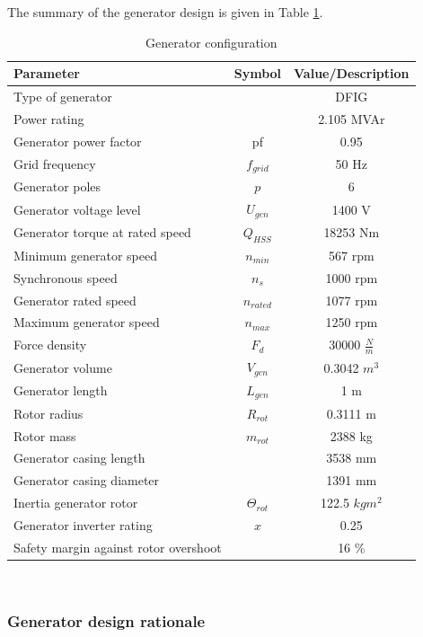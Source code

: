 The summary of the generator design is given in Table \ref{tab:generator_config}. 
\begin{table}[h]
\centering
\caption{Generator configuration}
\label{tab:generator_config}
\begin{tabular}{ |l|c|c|} 
\hline
\textbf{Parameter} & \textbf{Symbol} & \textbf{Value/Description}  \\ 
\hline
Type of generator & & DFIG\\
\hline
Power rating & & 2.105 MVAr\\
\hline
Generator power factor & pf & 0.95\\
\hline
Grid frequency & $f_{grid}$ & 50 Hz  \\
\hline
Generator poles & $p$ & 6\\
\hline
Generator voltage level & $U_{gen}$ & 1400 V\\
\hline
Generator torque at rated speed & $Q_{HSS}$ & 18253 Nm \\
\hline
Minimum generator speed & $n_{min}$ & 567 rpm\\
\hline
Synchronous speed & $n_s$ & 1000 rpm\\
\hline
Generator rated speed & $n_{rated}$ & 1077 rpm\\
\hline
Maximum generator speed & $n_{max}$ & 1250 rpm \\
\hline
Force density & $F_d$ & 30000 $\frac{N}{m}$\\
\hline
Generator volume & $V_{gen}$ & 0.3042 $m^3$\\
\hline
Generator length & $L_{gen}$ & 1 m\\
\hline
Rotor radius & $R_{rot}$ & 0.3111 m\\
\hline
Rotor mass & $m_{rot}$ & 2388 kg \\
\hline
Generator casing length& & 3538 mm\\
\hline
Generator casing diameter& & 1391 mm\\
\hline
Inertia generator rotor & $\Theta_{rot}$ & 122.5 $kg m^2$\\
\hline
Generator inverter rating & $x$ & 0.25\\
\hline
Safety margin against rotor overshoot & & 16 \%\\
\hline
\end{tabular} \\
\end{table}

\subsubsection{Generator design rationale}

